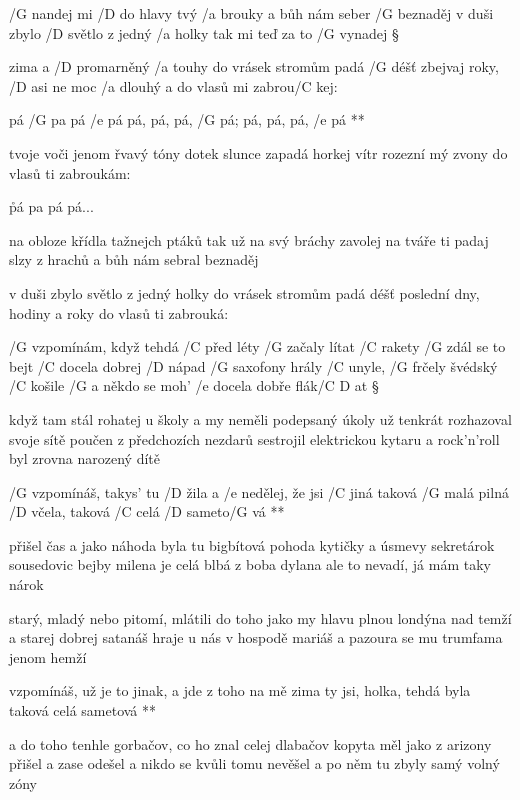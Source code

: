 
/G nandej mi /D do hlavy tvý /a brouky
a bůh nám seber /G beznaděj
v duši zbylo /D světlo z jedný /a holky
tak mi teď za to /G vynadej \S

zima a /D promarněný /a touhy
do vrásek stromům padá /G déšť
zbejvaj roky, /D asi ne moc /a dlouhý
a do vlasů mi zabrou/C kej:

\R  pá /G pa pá /e pá
    pá, pá, pá, /G pá; pá, pá, pá, /e pá  **

tvoje voči jenom řvavý tóny
dotek slunce zapadá
horkej vítr rozezní mý zvony
do vlasů ti zabroukám:

\r  pá pa pá pá...

na obloze křídla tažnejch ptáků
tak už na svý bráchy zavolej
na tváře ti padaj slzy z hrachů
a bůh nám sebral beznaděj \s

v duši zbylo světlo z jedný holky
do vrásek stromům padá déšť
poslední dny, hodiny a roky
do vlasů ti zabrouká:

\rr




/G vzpomínám, když tehdá /C před léty /G začaly lítat /C rakety
/G zdál se to bejt /C docela dobrej /D nápad
/G saxofony hrály /C unyle, /G frčely švédský /C košile
/G a někdo se moh' /e docela dobře flák/{C D} at \S

když tam stál rohatej u školy a my neměli podepsaný úkoly
už tenkrát rozhazoval svoje sítě
poučen z předchozích nezdarů sestrojil elektrickou kytaru
a rock'n'roll byl zrovna narozený dítě

\R  /G vzpomínáš, takys' tu /D žila a /e nedělej, že jsi /C jiná
    taková /G malá pilná /D včela, taková /C celá /D sameto/G vá **

přišel čas a jako náhoda byla tu bigbítová pohoda
kytičky a úsmevy sekretárok
sousedovic bejby milena je celá blbá z boba dylana
ale to nevadí, já mám taky nárok \s

starý, mladý nebo pitomí, mlátili do toho jako my
hlavu plnou londýna nad temží
a starej dobrej satanáš hraje u nás v hospodě mariáš
a pazoura se mu trumfama jenom hemží

\R  vzpomínáš, už je to jinak, a jde z toho na mě zima
    ty jsi, holka, tehdá byla taková celá sametová **

a do toho tenhle gorbačov, co ho znal celej dlabačov
kopyta měl jako z arizony
přišel a zase odešel a nikdo se kvůli tomu nevěšel
a po něm tu zbyly samý volný zóny

